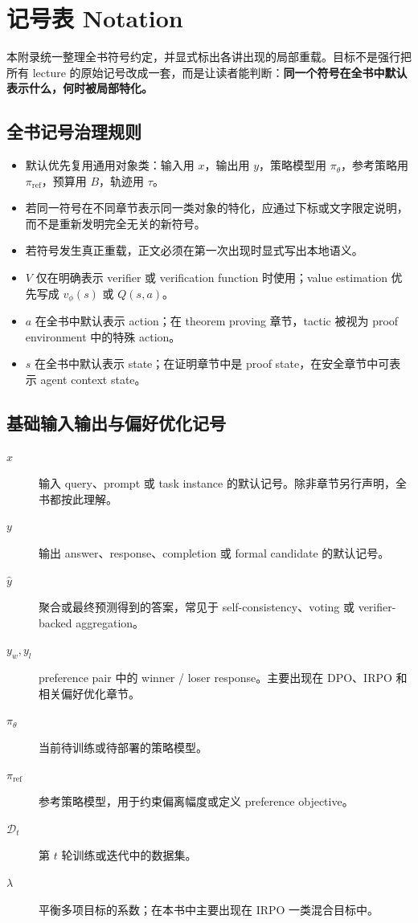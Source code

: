 \chapter{记号表 Notation}

本附录统一整理全书符号约定，并显式标出各讲出现的局部重载。目标不是强行把所有 lecture 的原始记号改成一套，而是让读者能判断：\textbf{同一个符号在全书中默认表示什么，何时被局部特化。}

\section{全书记号治理规则}

\begin{itemize}
\item 默认优先复用通用对象类：输入用 $x$，输出用 $y$，策略模型用 $\pi_\theta$，参考策略用 $\pi_{\mathrm{ref}}$，预算用 $B$，轨迹用 $\tau$。
\item 若同一符号在不同章节表示同一类对象的特化，应通过下标或文字限定说明，而不是重新发明完全无关的新符号。
\item 若符号发生真正重载，正文必须在第一次出现时显式写出本地语义。
\item $V$ 仅在明确表示 verifier 或 verification function 时使用；value estimation 优先写成 $v_\phi(s)$ 或 $Q(s,a)$。
\item $a$ 在全书中默认表示 action；在 theorem proving 章节，tactic 被视为 proof environment 中的特殊 action。
\item $s$ 在全书中默认表示 state；在证明章节中是 proof state，在安全章节中可表示 agent context state。
\end{itemize}

\section{基础输入输出与偏好优化记号}

\begin{description}
\item[$x$] 输入 query、prompt 或 task instance 的默认记号。除非章节另行声明，全书都按此理解。

\item[$y$] 输出 answer、response、completion 或 formal candidate 的默认记号。

\item[$\hat{y}$] 聚合或最终预测得到的答案，常见于 self-consistency、voting 或 verifier-backed aggregation。

\item[$y_w, y_l$] preference pair 中的 winner / loser response。主要出现在 DPO、IRPO 和相关偏好优化章节。

\item[$\pi_\theta$] 当前待训练或待部署的策略模型。

\item[$\pi_{\mathrm{ref}}$] 参考策略模型，用于约束偏离幅度或定义 preference objective。

\item[$\mathcal{D}_t$] 第 $t$ 轮训练或迭代中的数据集。

\item[$\lambda$] 平衡多项目标的系数；在本书中主要出现在 IRPO 一类混合目标中。
\end{description}

